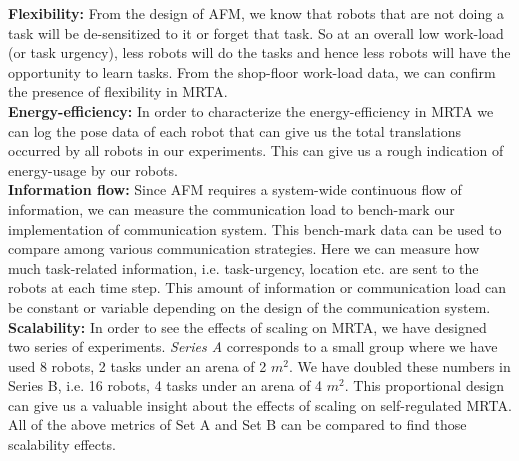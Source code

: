 \documentclass[final,5p,times,twocolumn]{elsarticle}
\begin{document}
\textbf{Flexibility:} From the design of AFM, we know that robots that are not doing a task will be de-sensitized to it or forget that task. So at an overall low work-load (or task urgency), less robots will do the tasks and hence less robots will have the opportunity to learn tasks. From the shop-floor work-load data, we can confirm the presence of flexibility in MRTA.\\
\textbf{Energy-efficiency:} In order to characterize the energy-efficiency in MRTA we can log the pose data of each robot that can give us the total translations occurred by all robots in our experiments. This can give us a rough indication of energy-usage by our robots. \\
\textbf{Information flow:} Since AFM requires a system-wide continuous flow of information, we can measure the communication load to bench-mark our implementation of communication system. This bench-mark data can be used to compare among various communication strategies. Here we can measure  how much task-related information, i.e. task-urgency, location etc. are sent to the robots at each time step. This  amount of information or communication load can be constant or variable depending on the design of the communication system.
\textbf{Scalability:} In order to see the effects of scaling on MRTA, we have designed two series of experiments. {\em Series A} corresponds to a small group where we have used 8 robots, 2 tasks under an arena of 2 $m^2$. We have doubled these numbers in {Series B}, i.e. 16 robots, 4 tasks under an arena of 4 $m^2$. This proportional design can give us a valuable insight about the effects of scaling on self-regulated MRTA. All of the above metrics of Set A and Set B can be compared to find those scalability effects.
\end{document}
